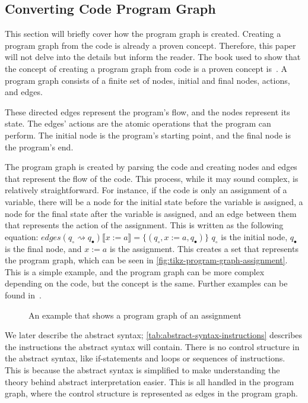 \subsection{Converting Code Program Graph}\label{subsection:converting-code-program-graph}
This section will briefly cover how the program graph is created.
Creating a program graph from the code is already a proven concept. Therefore, this paper will not delve into the details but inform the reader.
The book used to show that the concept of creating a program graph from code is a proven concept is~\cite[see][chap 2.2]{nielson_formal_2019}.
A program graph consists of a finite set of nodes, initial and final nodes, actions, and edges.

These directed edges represent the program's flow, and the nodes represent its state. The edges' actions are the atomic operations that the program can perform. The initial node is the program's starting point, and the final node is the program's end.

The program graph is created by parsing the code and creating nodes and edges that represent the flow of the code. This process, while it may sound complex, is relatively straightforward. For instance, if the code is only an assignment of a variable, there will be a node for the initial state before the variable is assigned, a node for the final state after the variable is assigned, and an edge between them that represents the action of the assignment. This is written as the following equation:
$edges(q_{\circ} \rightsquigarrow q_{\bullet})\llbracket x:=a \rrbracket = \{(q_{\circ}, x:=a, q_{\bullet})\}$
$q_{\circ}$ is the initial node, $q_{\bullet}$ is the final node, and $x:=a$ is the assignment. This creates a set that represents the program graph, which can be seen in \autoref{fig:tikz-program-graph-assignment}. This is a simple example, and the program graph can be more complex depending on the code, but the concept is the same.
Further examples can be found in~\cite[Figure 2.6]{nielson_formal_2019}.

\begin{figure}[htb!]
    \center
    
    \caption{An example that shows a program graph of an assignment}
    \label{fig:tikz-program-graph-assignment}
\end{figure}

We later describe the abstract syntax; \autoref{tab:abstract-syntax-instructions} describes the instructions the abstract syntax will contain.
There is no control structure in the abstract syntax, like if-statements and loops or sequences of instructions.
This is because the abstract syntax is simplified to make understanding the theory behind abstract interpretation easier.
This is all handled in the program graph, where the control structure is represented as edges in the program graph.


